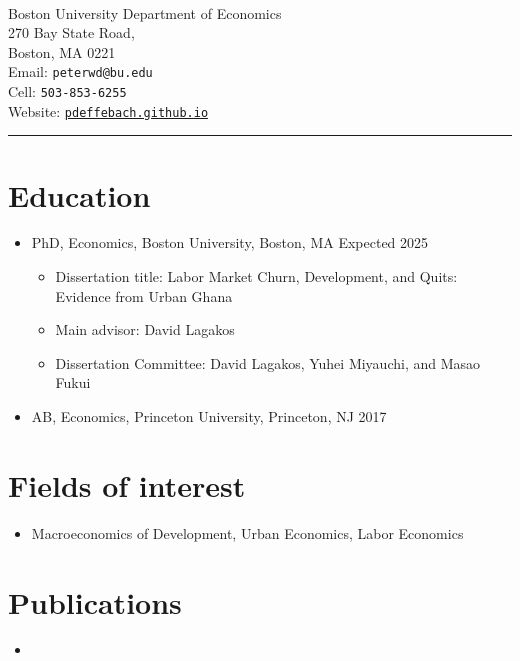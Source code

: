 \documentclass[12pt]{article}
\newenvironment{customitemize}
{ \begin{itemize}[
	leftmargin=\parindent,
	itemindent=-0.5\parindent,
	topsep = 0pt, 
	itemsep = -1pt, 
	label={}] }
{\end{itemize} }
\begin{document}
\normalsize
\singlespacing

\thispagestyle{plain}


\newcommand{\link}[2]{{\color{blue}\href{#1}{#2}}}

 \\
Boston University Department of Economics \\
270 Bay State Road, \\
Boston, MA 0221 \\
Email: \texttt{peterwd@bu.edu} \\
Cell: \texttt{503-853-6255} \\
Website: \href{https://pdeffebach.github.io/}{\texttt{pdeffebach.github.io}} \\
\rule{\textwidth}{1pt}
\section*{Education}

\begin{customitemize}
\item PhD, Economics, Boston University, Boston, MA  \hfill Expected 2025 
\begin{customitemize}
\item Dissertation title: Labor Market Churn, Development, and Quits: Evidence from Urban Ghana 
\item Main advisor: David Lagakos 
\item Dissertation Committee: David Lagakos, Yuhei Miyauchi, and Masao Fukui 
\end{customitemize}
\item AB, Economics, Princeton University, Princeton, NJ  \hfill 2017
\end{customitemize}
\section*{Fields of interest}

\begin{customitemize}
\item Macroeconomics of Development, Urban Economics, Labor Economics
\end{customitemize}


\section*{Publications}

\begin{customitemize}
	\item {}
\end{customitemize}
\end{document}
